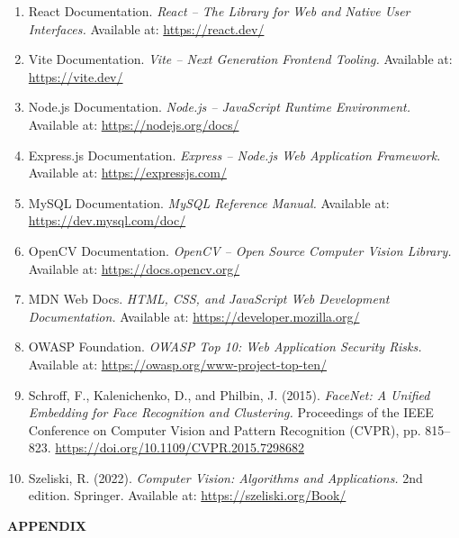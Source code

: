 
\begin{enumerate}
    \item React Documentation. \textit{React – The Library for Web and Native User Interfaces.} Available at: \url{https://react.dev/}

    \item Vite Documentation. \textit{Vite – Next Generation Frontend Tooling.} Available at: \url{https://vite.dev/}

    \item Node.js Documentation. \textit{Node.js – JavaScript Runtime Environment.} Available at: \url{https://nodejs.org/docs/}

    \item Express.js Documentation. \textit{Express – Node.js Web Application Framework.} Available at: \url{https://expressjs.com/}

    \item MySQL Documentation. \textit{MySQL Reference Manual.} Available at: \url{https://dev.mysql.com/doc/}

    \item OpenCV Documentation. \textit{OpenCV – Open Source Computer Vision Library.} Available at: \url{https://docs.opencv.org/}

    \item MDN Web Docs. \textit{HTML, CSS, and JavaScript Web Development Documentation.} Available at: \url{https://developer.mozilla.org/}

    \item OWASP Foundation. \textit{OWASP Top 10: Web Application Security Risks.} Available at: \url{https://owasp.org/www-project-top-ten/}

    \item Schroff, F., Kalenichenko, D., and Philbin, J. (2015). \textit{FaceNet: A Unified Embedding for Face Recognition and Clustering.} Proceedings of the IEEE Conference on Computer Vision and Pattern Recognition (CVPR), pp. 815–823. \url{https://doi.org/10.1109/CVPR.2015.7298682}

    \item Szeliski, R. (2022). \textit{Computer Vision: Algorithms and Applications.} 2nd edition. Springer. Available at: \url{https://szeliski.org/Book/}
\end{enumerate}

\clearpage
\begin{center}
    \vspace*{\fill}
    \fontsize{28}{28}\selectfont \textbf{APPENDIX}
    \vspace*{\fill}
\end{center}
\clearpage
